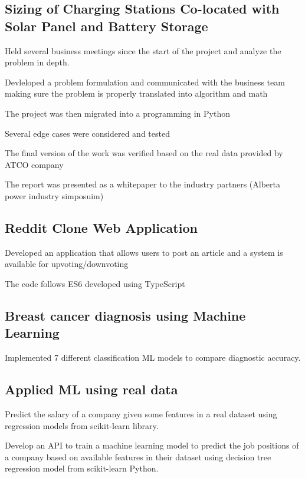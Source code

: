 \documentclass[letter,10pt]{article}
\begin{document}
	
	\subsection{Sizing of Charging Stations Co-located with Solar Panel and Battery Storage}
	\begin{zitemize}
		\item Held several business meetings since the start of the project and analyze the problem in depth.
		\item Devleloped a problem formulation and communicated with the business team making sure the problem is properly translated into algorithm and math
		\item The project was then migrated into a programming in Python
		\item Several edge cases were considered and tested
		\item The final version of the work was verified based on the real data provided by ATCO company
		\item The report was presented as a whitepaper to the industry partners (Alberta power industry simposuim)
	\end{zitemize}
	\subsection{Reddit Clone Web Application}
	\begin{zitemize}
		\item Developed an application that allows users to post an article and a system is available for upvoting/downvoting
		\item The code follows ES6 developed using TypeScript
	\end{zitemize}

	\subsection{Breast cancer diagnosis using Machine Learning}
	\begin{zitemize}
		\item Implemented 7 different classification ML models to compare diagnostic accuracy.
	\end{zitemize}	
	\subsection{Applied ML using real data}
	\begin{zitemize}
		\item Predict the salary of a company given some features in a real dataset using regression models from scikit-learn library.
		\item Develop an API to train a machine learning model to predict the job positions of a company based on available features in their dataset using decision tree regression model from scikit-learn Python.
	\end{zitemize}
\end{document}
